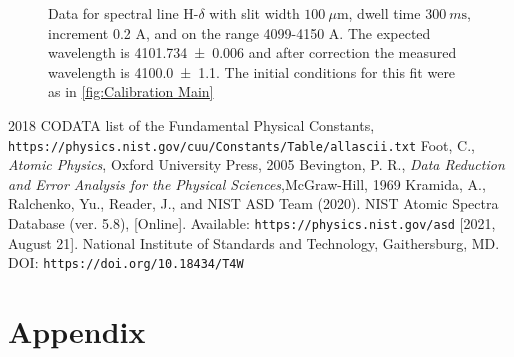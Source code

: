 \documentclass[11pt]{article}
\numberwithin{equation}{section}
\numberwithin{figure}{section}
\numberwithin{table}{section}
\begin{document}
\begin{figure}[H]
    \begin{center}
       \caption{Data for spectral line H-$\delta$ with slit width $\SI{100}{\mu\m}$, dwell time $\SI{300}{m\second}$, increment 0.2 A, and on the range 4099-4150 A. The expected wavelength is \num{4101.734\pm0.006}\cite{Spectral Lines} and after correction the measured wavelength is \num{4100.0\pm1.1}. The initial conditions for this fit were as in \autoref{fig:Calibration Main}}
       \label{fig:DataMain}
    \end{center}
\end{figure}



\begin{thebibliography}{9}
    2018 CODATA list of the Fundamental Physical Constants, \texttt{https://physics.nist.gov/cuu/Constants/Table/allascii.txt}
    Foot, C., \textit{Atomic Physics}, Oxford University Press, 2005
    Bevington, P. R., \textit{Data Reduction and Error Analysis for the Physical Sciences},McGraw-Hill, 1969
    Kramida, A., Ralchenko, Yu., Reader, J., and NIST ASD Team (2020). NIST Atomic Spectra Database (ver. 5.8), [Online]. Available: \texttt{https://physics.nist.gov/asd} [2021, August 21]. National Institute of Standards and Technology, Gaithersburg, MD. DOI: \texttt{https://doi.org/10.18434/T4W}
\end{thebibliography}


\newpage
\section{Appendix}\label{sec:Appendix}
\setcounter{figure}{0} \renewcommand{\thefigure}{A.\arabic{figure}}
\end{document}
